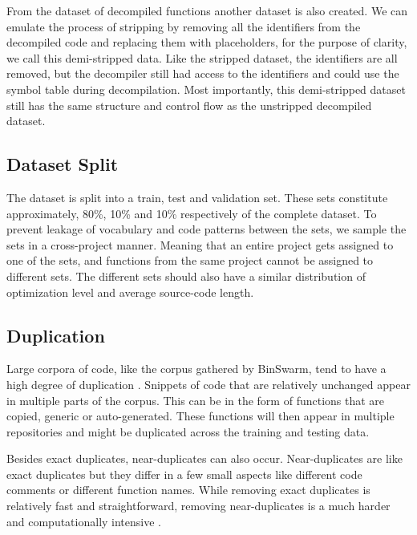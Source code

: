 From the dataset of decompiled functions another dataset is also created. We can emulate the process of stripping by removing all the identifiers from the decompiled code and replacing them with placeholders, for the purpose of clarity, we call this demi-stripped data. Like the stripped dataset, the identifiers are all removed, but the decompiler still had access to the identifiers and could use the symbol table during decompilation. Most importantly, this demi-stripped dataset still has the same structure and control flow as the unstripped decompiled dataset.

\subsection{Dataset Split}
The dataset is split into a train, test and validation set. These sets constitute approximately, 80\%, 10\% and 10\% respectively\cite{recommend_summarization} of the complete dataset. To prevent leakage of vocabulary and code patterns between the sets, we sample the sets in a cross-project manner. Meaning that an entire project gets assigned to one of the sets, and functions from the same project cannot be assigned to different sets. The different sets should also have a similar distribution of optimization level and average source-code length.

\subsection{Duplication}
Large corpora of code, like the corpus gathered by BinSwarm, tend to have a high degree of duplication \cite{leclair_recommendations}. Snippets of code that are relatively unchanged appear in multiple parts of the corpus. This can be in the form of functions that are copied, generic or auto-generated. These functions will then appear in multiple repositories and might be duplicated across the training and testing data.

Besides exact duplicates, near-duplicates can also occur. Near-duplicates are like exact duplicates but they differ in a few small aspects like different code comments or different function names. While removing exact duplicates is relatively fast and straightforward, removing near-duplicates is a much harder and computationally intensive \cite{allamanis_adverse}. 

